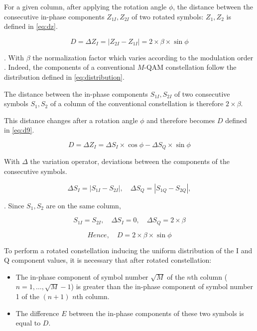 For a given column, after applying the rotation angle $\phi$, the distance
between the consecutive in-phase components $Z_{1I}, Z_{2I}$ of two rotated
symbols: $Z_1, Z_2$ is defined in \eqref{eq:dz}.

\begin{equation}
  D = \Delta Z_I = |Z_{2I} - Z_{1I}| = 2 \times \beta \times \sin\phi
  \label{eq:dz}
\end{equation}

\noindent. With $\beta$ the normalization factor which varies according to
the modulation order \cite{ref6}. Indeed, the components of a
conventional $M$-QAM constellation follow the distribution defined in
\eqref{eq:distribution}.

The distance between the in-phase components $S_{1I}, S_{2I}$ of two
consecutive symbols $S_1, S_2$ of a column of the conventional constellation
is therefore $2 \times \beta$.

This distance changes after a rotation angle $\phi$ and therefore becomes
$D$ defined in \eqref{eq:d9}.

\begin{equation}
  D = \Delta Z_I = \Delta S_I \times \cos\phi - \Delta S_Q \times \sin\phi
  \label{eq:d9}
\end{equation}

With $\Delta$ the variation operator, deviations between the components of
the consecutive symbols.

\begin{equation}
  \Delta S_I = |S_{1I} - S_{2I}|, \quad \Delta S_Q = |S_{1Q} - S_{2Q}|,
  \label{eq:deltas}
\end{equation}

\noindent. Since $S_1, S_2$ are on the same column,

\begin{equation}
  S_{1I} = S_{2I}, \quad \Delta S_I = 0, \quad \Delta S_Q = 2 \times \beta
  \label{eq:same-column}
\end{equation}

\begin{equation}
  \textit{Hence}, \quad D = 2 \times \beta \times \sin\phi
  \label{eq:d12}
\end{equation}

To perform a rotated constellation inducing the uniform distribution of the
I and Q component values, it is necessary that after rotated constellation:

\begin{itemize}
  \item The in-phase component of symbol number $\sqrt{M}$ of the $n$th
  column ($n = 1,\ldots,\sqrt{M}-1$) is greater than the in-phase component
  of symbol number 1 of the $(n+1)$ $n$th column.

  \item The difference $E$ between the in-phase components of these two
  symbols is equal to $D$.
\end{itemize}

